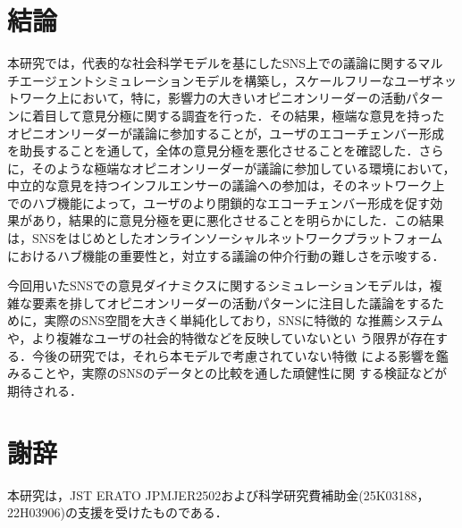\documentclass[a4j]{ujarticle}
\begin{document}
\section{結論}
本研究では，代表的な社会科学モデルを基にしたSNS上での議論に関するマル
チエージェントシミュレーションモデルを構築し，スケールフリーなユーザネッ
トワーク上において，特に，影響力の大きいオピニオンリーダーの活動パター
ンに着目して意見分極に関する調査を行った．その結果，極端な意見を持った
オピニオンリーダーが議論に参加することが，ユーザのエコーチェンバー形成
を助長することを通して，全体の意見分極を悪化させることを確認した．さら
に，そのような極端なオピニオンリーダーが議論に参加している環境において，
中立的な意見を持つインフルエンサーの議論への参加は，そのネットワーク上
でのハブ機能によって，ユーザのより閉鎖的なエコーチェンバー形成を促す効
果があり，結果的に意見分極を更に悪化させることを明らかにした．この結果
は，SNSをはじめとしたオンラインソーシャルネットワークプラットフォーム
におけるハブ機能の重要性と，対立する議論の仲介行動の難しさを示唆する．
\par


今回用いたSNSでの意見ダイナミクスに関するシミュレーションモデルは，複
雑な要素を排してオピニオンリーダーの活動パターンに注目した議論をするた
めに，実際のSNS空間を大きく単純化しており，SNSに特徴的
な推薦システムや，より複雑なユーザの社会的特徴などを反映していないとい
う限界が存在する．今後の研究では，それら本モデルで考慮されていない特徴
による影響を鑑みることや，実際のSNSのデータとの比較を通した頑健性に関
する検証などが期待される．
\par



\section*{謝辞}
本研究は，JST ERATO JPMJER2502および科学研究費補助金(25K03188，22H03906)の支援を受けたものである．




\small


\end{document}
